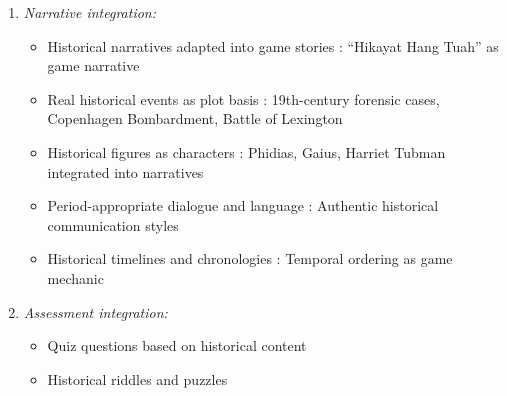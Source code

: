 \documentclass[a4paper,fleqn]{cas-sc}
\begin{document}
\begin{enumerate}[noitemsep]
\begin{itemize}[noitemsep]
 \item Economic and governance simulation: Players managing historical economic systems \citep{9Lin2018}
 
 \item Strategic military campaigns: Historical battles and campaigns as game scenarios \citep{8Yu2014, 20Erandaru2014, 24Ghannem2019, 47Clara2010156, 64Hsu201324, 74Fendt2019, 77Ramansyah2021}
 
 \item Civilization development: Players guiding civilizations through historical periods \citep{8Yu2014, 55Squire2004}
\end{itemize}

	\item 
\textit{Narrative integration:}
\begin{itemize}[noitemsep]
 \item Historical narratives adapted into game stories \citep{2Mahamarowi2023133}: ``Hikayat Hang Tuah'' as game narrative
 
 \item Real historical events as plot basis \citep{41Petersen2023301, 49Huizenga2007127, 54Gibson2007, 71lynch2015pedagogical, 80gottlieb2018your}: 19th-century forensic cases, Copenhagen Bombardment, Battle of Lexington
 
 \item Historical figures as characters \citep{17Manzanares2019, 47Clara2010156, 71lynch2015pedagogical}: Phidias, Gaius, Harriet Tubman integrated into narratives
 
 \item Period-appropriate dialogue and language \citep{60Hoy2018}: Authentic historical communication styles
 
 \item Historical timelines and chronologies \citep{11Ternblad2023115, 19Chou2019, 47Clara2010156, 70Hou201519}: Temporal ordering as game mechanic
\end{itemize}

	\item 
\textit{Assessment integration:}
\begin{itemize}[noitemsep]
 \item Quiz questions based on historical content \citep{1Barbatsis201159, 4Cruz2017, 5kazanidis2018alpha, 13Humpire2022, 40Kuran2018, 42Huffer201581, 52Lin2011265, 62Milosz201896, 63Liu2021, 73Wolfartsberger2011160, 79Fernes2024379}
 
 \item Historical riddles and puzzles \citep{5kazanidis2018alpha, 6Czerwinski2018, 39Tegos2014838, 49Huizenga2007127, 69Wong2017150}
 

\end{itemize}
\end{enumerate}
\end{document}
